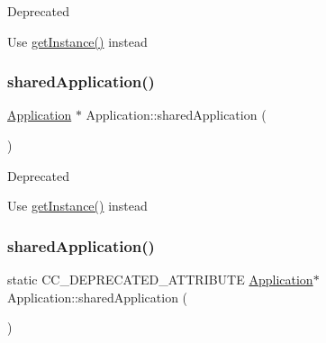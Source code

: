 \begin{DoxyRefDesc}{Deprecated}
\item[\hyperlink{deprecated__deprecated000360}{Deprecated}]Use \hyperlink{classApplication_a723b8bba6edce3769a8d771770ca10e1}{get\+Instance()} instead \end{DoxyRefDesc}
\mbox{\label{classApplication_aa20c8b14353e12b2f35e147896dd322e}} 
\subsubsection{\texorpdfstring{shared\+Application()}{sharedApplication()}\hspace{0.1cm}{\footnotesize\ttfamily [5/11]}}
{\footnotesize\ttfamily \hyperlink{classApplication}{Application} $\ast$ Application\+::shared\+Application (\begin{DoxyParamCaption}{ }\end{DoxyParamCaption})\hspace{0.3cm}{\ttfamily [static]}}

\begin{DoxyRefDesc}{Deprecated}
\item[\hyperlink{deprecated__deprecated000113}{Deprecated}]Use \hyperlink{classApplication_a723b8bba6edce3769a8d771770ca10e1}{get\+Instance()} instead \end{DoxyRefDesc}
\mbox{\label{classApplication_a13774a693274456e734b221cea01628c}} 
\subsubsection{\texorpdfstring{shared\+Application()}{sharedApplication()}\hspace{0.1cm}{\footnotesize\ttfamily [6/11]}}
{\footnotesize\ttfamily static C\+C\+\_\+\+D\+E\+P\+R\+E\+C\+A\+T\+E\+D\+\_\+\+A\+T\+T\+R\+I\+B\+U\+TE \hyperlink{classApplication}{Application}$\ast$ Application\+::shared\+Application (\begin{DoxyParamCaption}{ }\end{DoxyParamCaption})\hspace{0.3cm}{\ttfamily [static]}}

